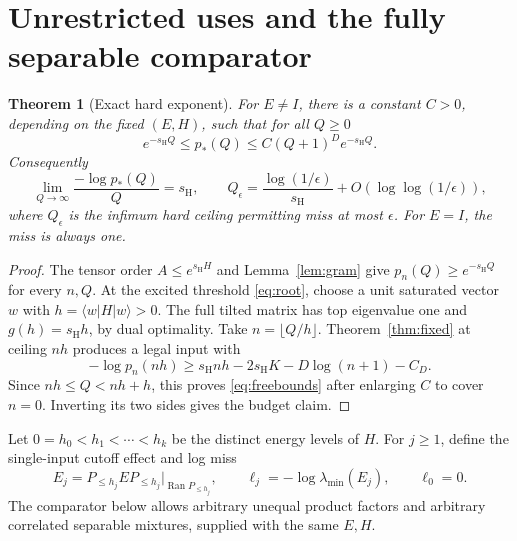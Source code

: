 \documentclass[11pt,a4paper]{article}
\newtheorem{theorem}{Theorem}[section]
\theoremstyle{remark}
\DeclareMathOperator{\Ran}{Ran}
\newcommand{\ket}[1]{|#1\rangle}
\newcommand{\bra}[1]{\langle #1|}
\newcommand{\sh}{s_{\mathrm H}}
\newcommand{\popt}{p_*}
\begin{document}
\section{Unrestricted uses and the fully separable comparator}
\begin{theorem}[Exact hard exponent]\label{thm:free}
For \(E\ne I\), there is a constant \(C>0\), depending on the fixed
\((E,H)\), such that for all \(Q\geq0\)
\begin{equation}\label{eq:freebounds}
 e^{-\sh Q}\leq\popt(Q)\leq C(Q+1)^D e^{-\sh Q}.
\end{equation}
Consequently
\[
 \lim_{Q\to\infty}\frac{-\log\popt(Q)}Q=\sh,\qquad
 Q_\epsilon=\frac{\log(1/\epsilon)}{\sh}
              +O(\log\log(1/\epsilon)),
\]
where \(Q_\epsilon\) is the infimum hard ceiling permitting miss at most
\(\epsilon\). For \(E=I\), the miss is always one.
\end{theorem}
\begin{proof}
The tensor order \(A\leq e^{\sh H}\) and Lemma~\ref{lem:gram} give
\(p_n(Q)\geq e^{-\sh Q}\) for every \(n,Q\).
At the excited threshold \eqref{eq:root}, choose a unit saturated vector
\(w\) with \(h=\bra wH\ket w>0\). The full tilted matrix has top
eigenvalue one and \(g(h)=\sh h\), by dual optimality.
Take \(n=\lfloor Q/h\rfloor\). Theorem~\ref{thm:fixed} at ceiling \(nh\)
produces a legal input with
\[
 -\log p_n(nh)\geq\sh nh-2\sh K-D\log(n+1)-C_D.
\]
Since \(nh\leq Q<nh+h\), this proves \eqref{eq:freebounds} after enlarging
\(C\) to cover \(n=0\). Inverting its two sides gives the budget claim.
\end{proof}

Let \(0=h_0<h_1<\cdots<h_k\) be the distinct energy levels of \(H\).
For \(j\geq1\), define the single-input cutoff effect and log miss
\begin{equation}\label{eq:cutoffpoints}
 E_j=P_{\leq h_j}EP_{\leq h_j}\big|_{\Ran P_{\leq h_j}},\qquad
 \ell_j=-\log\lambda_{\min}(E_j),\qquad \ell_0=0.
\end{equation}
The comparator below allows arbitrary unequal product factors and arbitrary
correlated separable mixtures, supplied with the same \(E,H\).
\end{document}
